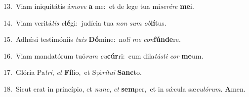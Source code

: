 {\numbfont\textcolor{\numbcolor}{13.}}~Viam iniquitátis á\-\textit{mo}\-\textit{ve} \textbf{a} me:~\star et de lege tua mi\-\textit{se}\-\textit{ré}\textit{re} \textbf{me}\-i.\par
{\numbfont\textcolor{\numbcolor}{14.}}~Viam veritá\textit{tis} \textit{e}\-\textbf{lé}gi:~\star judícia tua \textit{non} \textit{sum} \textit{ob}\-\textbf{lí}tus.\par
{\numbfont\textcolor{\numbcolor}{15.}}~Adhǽsi testimóniis \textit{tu}\-\textit{is} \textbf{Dó}\-mine:~\star no\textit{li} \textit{me} \textit{con}\-\textbf{fún}\textbf{de}re.\par
{\numbfont\textcolor{\numbcolor}{16.}}~Viam mandatórum tuó\textit{rum} \textit{cu}\-\textbf{cúr}ri:~\star cum dila\-\textit{tás}\-\textit{ti} \textit{cor} \textbf{me}\-um.\par
{\numbfont\textcolor{\numbcolor}{17.}}~Glória Pa\-\textit{tri}\-, \textit{et} \textbf{Fí}\-lio,~\star et Spi\-\textit{rí}\-\textit{tu}\textit{i} \textbf{Sanc}\-to.\par
{\numbfont\textcolor{\numbcolor}{18.}}~Sicut erat in princípio, et \textit{nunc}\-, \textit{et} \textbf{sem}\-per,~\star et in sǽcula sæ\-\textit{cu}\-\textit{ló}\textit{rum}. \textbf{A}\-men.\par
